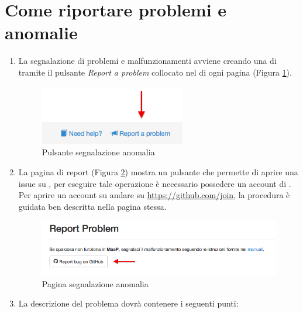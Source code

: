 \clearpage
\section{Come riportare problemi e anomalie}
	\begin{enumerate}
		
		\item La segnalazione di problemi e malfunzionamenti avviene creando una  di  tramite il pulsante \emph{Report a problem} collocato nel  di ogni pagina (Figura \ref{fig:probelmReportButton}).

		\begin{figure}[H]
				\label{fig:showpage}
					\centering \includegraphics[width=0.6\textwidth]{img/probelmReportButton.png}
				\caption{\label{fig:probelmReportButton} Pulsante segnalazione anomalia}
		\end{figure}

		\item La pagina di report (Figura \ref{fig:paginaProbelmReport}) mostra un pulsante che permette di aprire una issue su , per eseguire tale operazione è necessario possedere un account di . Per aprire un account su  andare su \url{https://github.com/join}, la procedura è guidata ben descritta nella pagina stessa.

		\begin{figure}[H]
				\label{fig:showpage}
					\centering \includegraphics[width=1\textwidth]{img/paginaProbelmReport.png}
				\caption{\label{fig:paginaProbelmReport} Pagina segnalazione anomalia}
		\end{figure}

		\item La descrizione del problema dovrà contenere i seguenti punti:


\end{enumerate}
